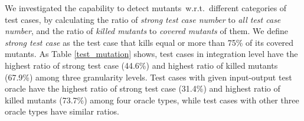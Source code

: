    
    \begin{table}[!t]
        \begin{center}
          \tabcolsep=1.0mm
            \caption{Test Case Mutation Results}
            \vspace{-5pt}
        \label{test_mutation}
    \end{center}
        \end{table}
    
    We investigated the capability to detect mutants~w.r.t.~different categories of test cases, by calculating the ratio of \textit{strong test case number} to \textit{all test case number}, and the ratio of \textit{killed mutants} to \textit{covered mutants} of them.  
    We define \textit{strong test case} as the test case that kills equal or more than 75\% of its covered mutants. 
    As Table \ref{test_mutation} shows, test cases in integration level have the highest ratio of strong test case (44.6\%) and highest ratio of killed mutants (67.9\%) among three granularity levels.
    Test cases with given input-output test oracle have the highest ratio of strong test case (31.4\%)  and highest ratio of killed mutants (73.7\%) among four oracle types, while test cases with other three oracle types have similar ratios.  


